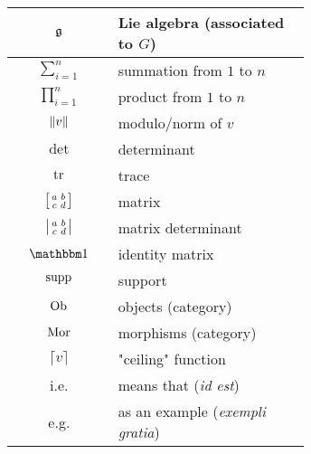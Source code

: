 \begin{table}[H]
{\begin{tabular}{|c|p{0.65\linewidth}|}
					\hline
					$ \mathfrak{g} $ & Lie algebra (associated to $ G $) \\
					\hline
					$ \sum_{i=1}^{n} $ & summation from $ 1 $ to $ n $ \\
					\hline
					$ \prod_{i=1}^{n} $ & product from $ 1 $ to $ n $ \\
					\hline
					$ \norm{v} $ & modulo/norm of $ v $ \\
					\hline
					$ \det $ & determinant \\
					\hline
					$ \tr $ & trace \\
					\hline
					$ \sbmqty{ a & b \\ c & d } $ & matrix \\
					\hline
					$ \smdet{ a & b \\ c & d } $ & matrix determinant \\
					\hline
					$ \bigone $ & identity matrix \\
					\hline
					$ \operatorname{supp} $ & support \\
					\hline
					$ \operatorname{Ob} $ & objects (category) \\
					\hline
					$ \operatorname{Mor} $ & morphisms (category) \\
					\hline
					$ \lceil v \rceil $ & "ceiling" function \\
					\hline
					i.e. & means that (\textit{id est}) \\
					\hline
					e.g. & as an example (\textit{exempli gratia}) \\
					\hline
				\end{tabular}
				}
\end{table}
